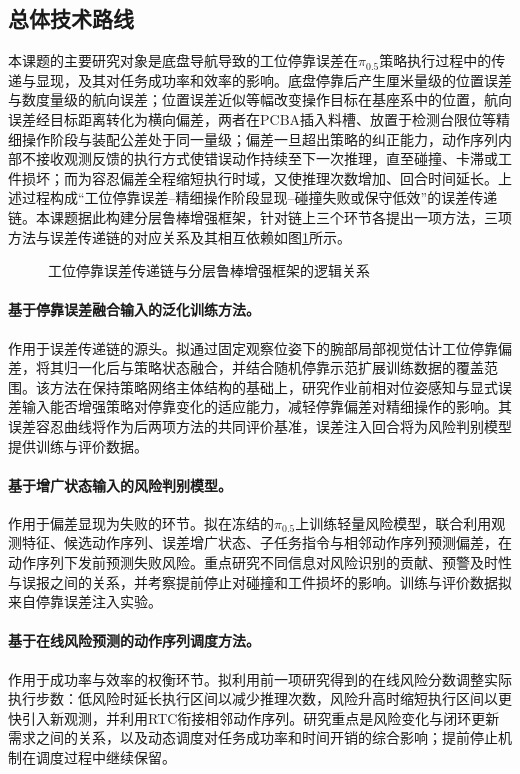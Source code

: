 \subsection{总体技术路线}

本课题的主要研究对象是底盘导航导致的工位停靠误差在\(\pi_{0.5}\)策略执行过程中的传递与显现，及其对任务成功率和效率的影响。底盘停靠后产生厘米量级的位置误差与数度量级的航向误差；位置误差近似等幅改变操作目标在基座系中的位置，航向误差经目标距离转化为横向偏差，两者在PCBA插入料槽、放置于检测台限位等精细操作阶段与装配公差处于同一量级；偏差一旦超出策略的纠正能力，动作序列内部不接收观测反馈的执行方式使错误动作持续至下一次推理，直至碰撞、卡滞或工件损坏；而为容忍偏差全程缩短执行时域，又使推理次数增加、回合时间延长。上述过程构成“工位停靠误差--精细操作阶段显现--碰撞失败或保守低效”的误差传递链。本课题据此构建分层鲁棒增强框架，针对链上三个环节各提出一项方法，三项方法与误差传递链的对应关系及其相互依赖如图\ref{fig:error-chain-defense}所示。

\begin{figure}[htbp]
  \centering
  
  \caption{工位停靠误差传递链与分层鲁棒增强框架的逻辑关系}
  \label{fig:error-chain-defense}
\end{figure}

\paragraph{基于停靠误差融合输入的泛化训练方法。}作用于误差传递链的源头。拟通过固定观察位姿下的腕部局部视觉估计工位停靠偏差，将其归一化后与策略状态融合，并结合随机停靠示范扩展训练数据的覆盖范围。该方法在保持策略网络主体结构的基础上，研究作业前相对位姿感知与显式误差输入能否增强策略对停靠变化的适应能力，减轻停靠偏差对精细操作的影响。其误差容忍曲线将作为后两项方法的共同评价基准，误差注入回合将为风险判别模型提供训练与评价数据。

\paragraph{基于增广状态输入的风险判别模型。}作用于偏差显现为失败的环节。拟在冻结的\(\pi_{0.5}\)上训练轻量风险模型，联合利用观测特征、候选动作序列、误差增广状态、子任务指令与相邻动作序列预测偏差，在动作序列下发前预测失败风险。重点研究不同信息对风险识别的贡献、预警及时性与误报之间的关系，并考察提前停止对碰撞和工件损坏的影响。训练与评价数据拟来自停靠误差注入实验。

\paragraph{基于在线风险预测的动作序列调度方法。}作用于成功率与效率的权衡环节。拟利用前一项研究得到的在线风险分数调整实际执行步数：低风险时延长执行区间以减少推理次数，风险升高时缩短执行区间以更快引入新观测，并利用RTC衔接相邻动作序列。研究重点是风险变化与闭环更新需求之间的关系，以及动态调度对任务成功率和时间开销的综合影响；提前停止机制在调度过程中继续保留。

